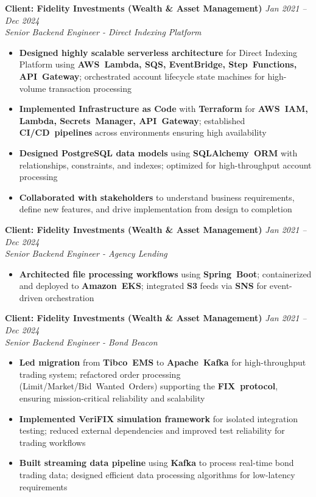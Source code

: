 \documentclass[11pt,a4paper]{article}
\newcommand{\resumeItem}[1]{\item\small{#1}}
\newcommand{\resumeItemList}[1]{\begin{itemize}[leftmargin=0.5in, itemsep=0.25em, parsep=0pt, partopsep=0pt, topsep=0.25em]
    \small
    #1
\end{itemize}}
\begin{document}
\textbf{Client: Fidelity Investments (Wealth \& Asset Management)} \hfill \textit{Jan 2021 -- Dec 2024}\\
\textit{Senior Backend Engineer - Direct Indexing Platform}
\resumeItemList{
    \resumeItem{\textbf{Designed highly scalable serverless architecture} for Direct Indexing Platform using \textbf{AWS~Lambda, SQS, EventBridge, Step~Functions, API~Gateway}; orchestrated account lifecycle state machines for high-volume transaction processing}
    \resumeItem{\textbf{Implemented Infrastructure as Code} with \textbf{Terraform} for \textbf{AWS~IAM, Lambda, Secrets~Manager, API~Gateway}; established \textbf{CI/CD~pipelines} across environments ensuring high availability}
    \resumeItem{\textbf{Designed PostgreSQL data models} using \textbf{SQLAlchemy~ORM} with relationships, constraints, and indexes; optimized for high-throughput account processing}
    \resumeItem{\textbf{Collaborated with stakeholders} to understand business requirements, define new features, and drive implementation from design to completion}
}
\vspace{0.4em}

\textbf{Client: Fidelity Investments (Wealth \& Asset Management)} \hfill \textit{Jan 2021 -- Dec 2024}\\
\textit{Senior Backend Engineer - Agency Lending}
\resumeItemList{
    \resumeItem{\textbf{Architected file processing workflows} using \textbf{Spring~Boot}; containerized and deployed to \textbf{Amazon~EKS}; integrated \textbf{S3} feeds via \textbf{SNS} for event-driven orchestration}
}
\vspace{0.4em}

\textbf{Client: Fidelity Investments (Wealth \& Asset Management)} \hfill \textit{Jan 2021 -- Dec 2024}\\
\textit{Senior Backend Engineer - Bond Beacon}
\resumeItemList{
    \resumeItem{\textbf{Led migration} from \textbf{Tibco~EMS} to \textbf{Apache~Kafka} for high-throughput trading system; refactored order processing (Limit/Market/Bid~Wanted~Orders) supporting the \textbf{FIX~protocol}, ensuring mission-critical reliability and scalability}
    \resumeItem{\textbf{Implemented \textbf{VeriFIX} simulation framework} for isolated integration testing; reduced external dependencies and improved test reliability for trading workflows}
    \resumeItem{\textbf{Built streaming data pipeline} using \textbf{Kafka} to process real-time bond trading data; designed efficient data processing algorithms for low-latency requirements}
}
\vspace{0.4em}
\end{document}
